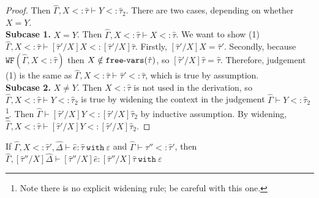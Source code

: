 \documentclass{llncs}
\newcommand{\keywadj}[1]{\mathtt{#1}}
\newcommand{\keyw}[1]{\keywadj{#1}~}
\newcommand{\kw}[1]{\keyw{ #1 }}
\newcommand{\kwa}[1]{\keywadj{ #1 }}
\newcommand{\hyphen}{\hbox{-}}
\newcommand{\wf}[1]{ \kwa{WF}(#1) }
\newcommand{\fv}[1]{ \kwa{free \hyphen vars}(#1) }
\begin{document}
\begin{proof}
 Then $\hat \Gamma, X <: \hat \tau \vdash Y <: \hat \tau_2$. There are two cases, depending on whether $X = Y$.\\

\textbf{Subcase 1.} $X = Y$. Then $\hat \Gamma, X <: \hat \tau \vdash X <: \hat \tau$. We want to show (1) $\hat \Gamma, X <: \hat \tau \vdash [\hat \tau'/X]X <: [\hat \tau'/X]\hat \tau$. Firstly, $[\hat \tau'/X]X = \hat \tau'$. Secondly, because $\wf{\hat \Gamma, X <: \hat \tau}$ then $X \notin \fv{\hat \tau}$, so $[\hat \tau'/X]\hat \tau = \hat \tau$. Therefore, judgement (1) is the same as $\hat \Gamma, X <: \hat \tau \vdash \hat \tau' <: \hat \tau$, which is true by assumption. \\

\textbf{Subcase 2.} $X \neq Y$. Then $X <: \hat \tau$ is not used in the derivation, so $\hat \Gamma, X <: \hat \tau \vdash Y <: \hat \tau_2$ is true by widening the context in the judgement $\hat \Gamma \vdash Y <: \hat \tau_2$\footnote{Note there is no explicit widening rule; be careful with this one.}. Then $\hat \Gamma \vdash [\hat \tau'/X]Y <: [\hat \tau'/X]\hat \tau_2$ by inductive assumption. By widening, $\hat \Gamma, X <: \hat \tau \vdash [\hat \tau'/X]Y <: [\hat \tau'/X]\hat \tau_2$.


\end{proof}


\hrulefill

\begin{lemma}
If $\hat \Gamma, X <: \hat \tau', \hat \Delta \vdash \hat e: \hat \tau~\kw{with} \varepsilon$ and $\hat \Gamma \vdash \hat \tau'' <: \hat \tau'$, then $\hat \Gamma, [\hat \tau''/X]\hat \Delta \vdash [\hat \tau''/X]\hat e: [\hat \tau''/X]\hat \tau~\kw{with} \varepsilon$
\end{lemma}
\end{document}
